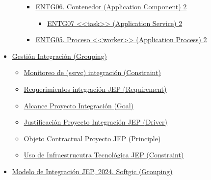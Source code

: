 \documentclass[
  paper=a4,
  ,captions=tableheading
]{scrartcl}
\providecommand{\tightlist}{%
  \setlength{\itemsep}{0pt}\setlength{\parskip}{0pt}}
\begin{document}
\begin{itemize}
\begin{itemize}
    \begin{itemize}
    \tightlist
    \item
      \hyperref[entg06.-contenedor-application-component-2]{ENTG06.
      Contenedor (Application Component) 2}

      \begin{itemize}
      \tightlist
      \item
        \hyperref[entg07-ux5cux253Cux5cux253Ctaskux5cux253Eux5cux253E-application-service-2]{ENTG07
        \textless\textless task\textgreater\textgreater{} (Application
        Service) 2}
      \end{itemize}
    \item
      \hyperref[entg05.-proceso-ux5cux253Cux5cux253Cworkerux5cux253Eux5cux253E-application-process-2]{ENTG05.
      Proceso \textless\textless worker\textgreater\textgreater{}
      (Application Process) 2}
    \end{itemize}
  \end{itemize}
\item
  \hyperref[gestiuxf3n-integraciuxf3n-grouping]{Gestión Integración
  (Grouping)}

  \begin{itemize}
  \tightlist
  \item
    \hyperref[monitoreo-de-ssrvc-integraciuxf3n-constraint]{Monitoreo de
    (ssrvc) integración (Constraint)}
  \item
    \hyperref[requerimientos-integraciuxf3n-jep-requirement]{Requerimientos
    integración JEP (Requirement)}
  \item
    \hyperref[alcance-proyecto-integraciuxf3n-goal]{Alcance Proyecto
    Integración (Goal)}
  \item
    \hyperref[justificaciuxf3n-proyecto-integraciuxf3n-jep-driver]{Justificación
    Proyecto Integración JEP (Driver)}
  \item
    \hyperref[objeto-contractual-proyecto-jep-principle]{Objeto
    Contractual Proyecto JEP (Principle)}
  \item
    \hyperref[uso-de-infraestrucutra-tecnoluxf3gica-jep-constraint]{Uso
    de Infraestrucutra Tecnológica JEP (Constraint)}
  \end{itemize}
\item
  \hyperref[modelo-de-integraciuxf3n-jepux2c-2024.-softgic-grouping]{Modelo
  de Integración JEP, 2024. Softgic (Grouping)}


\end{itemize}
\end{document}
